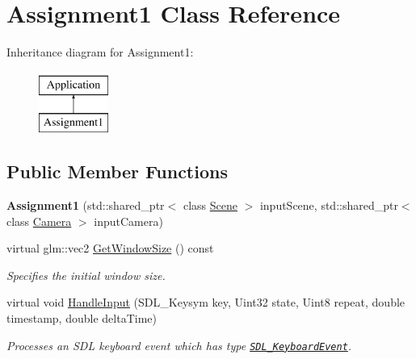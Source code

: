 \hypertarget{class_assignment1}{}\section{Assignment1 Class Reference}
\label{class_assignment1}
Inheritance diagram for Assignment1\+:\begin{figure}[H]
\begin{center}
\leavevmode
\includegraphics[height=2.000000cm]{class_assignment1}
\end{center}
\end{figure}
\subsection*{Public Member Functions}
\begin{DoxyCompactItemize}
\item 
\hypertarget{class_assignment1_ade9ef18c233dab37d37f20760fe7674d}{}{\bfseries Assignment1} (std\+::shared\+\_\+ptr$<$ class \hyperlink{class_scene}{Scene} $>$ input\+Scene, std\+::shared\+\_\+ptr$<$ class \hyperlink{class_camera}{Camera} $>$ input\+Camera)\label{class_assignment1_ade9ef18c233dab37d37f20760fe7674d}

\item 
virtual glm\+::vec2 \hyperlink{class_assignment1_a27daa24c1afe9e10bd6615dfa250473e}{Get\+Window\+Size} () const 
\begin{DoxyCompactList}\small\item\em Specifies the initial window size. \end{DoxyCompactList}\item 
virtual void \hyperlink{class_assignment1_ab9db4f51e177dd72130cd61d86b97535}{Handle\+Input} (S\+D\+L\+\_\+\+Keysym key, Uint32 state, Uint8 repeat, double timestamp, double delta\+Time)
\begin{DoxyCompactList}\small\item\em Processes an S\+D\+L keyboard event which has type \href{https://wiki.libsdl.org/SDL_KeyboardEvent}{\tt S\+D\+L\+\_\+\+Keyboard\+Event}. \end{DoxyCompactList}\end{DoxyCompactItemize}
